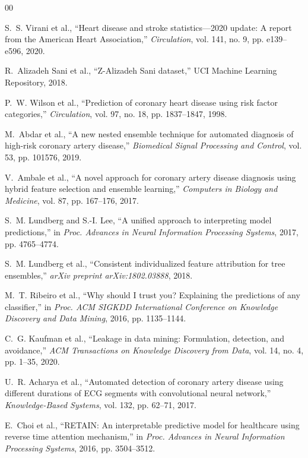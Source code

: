 \documentclass[conference]{IEEEtran}
\begin{document}
\begin{thebibliography}{00}

S.~S. Virani et al., ``Heart disease and stroke statistics---2020 update: A report from the American Heart Association,'' \textit{Circulation}, vol. 141, no. 9, pp. e139--e596, 2020.

R.~Alizadeh Sani et al., ``Z-Alizadeh Sani dataset,'' UCI Machine Learning Repository, 2018.

P.~W. Wilson et al., ``Prediction of coronary heart disease using risk factor categories,'' \textit{Circulation}, vol. 97, no. 18, pp. 1837--1847, 1998.

M.~Abdar et al., ``A new nested ensemble technique for automated diagnosis of high-risk coronary artery disease,'' \textit{Biomedical Signal Processing and Control}, vol. 53, pp. 101576, 2019.

V.~Ambale et al., ``A novel approach for coronary artery disease diagnosis using hybrid feature selection and ensemble learning,'' \textit{Computers in Biology and Medicine}, vol. 87, pp. 167--176, 2017.

S.~M. Lundberg and S.-I. Lee, ``A unified approach to interpreting model predictions,'' in \textit{Proc. Advances in Neural Information Processing Systems}, 2017, pp. 4765--4774.

S.~M. Lundberg et al., ``Consistent individualized feature attribution for tree ensembles,'' \textit{arXiv preprint arXiv:1802.03888}, 2018.

M.~T. Ribeiro et al., ``Why should I trust you? Explaining the predictions of any classifier,'' in \textit{Proc. ACM SIGKDD International Conference on Knowledge Discovery and Data Mining}, 2016, pp. 1135--1144.

C.~G. Kaufman et al., ``Leakage in data mining: Formulation, detection, and avoidance,'' \textit{ACM Transactions on Knowledge Discovery from Data}, vol. 14, no. 4, pp. 1--35, 2020.

U.~R. Acharya et al., ``Automated detection of coronary artery disease using different durations of ECG segments with convolutional neural network,'' \textit{Knowledge-Based Systems}, vol. 132, pp. 62--71, 2017.

E.~Choi et al., ``RETAIN: An interpretable predictive model for healthcare using reverse time attention mechanism,'' in \textit{Proc. Advances in Neural Information Processing Systems}, 2016, pp. 3504--3512.

\end{thebibliography}
\end{document}
